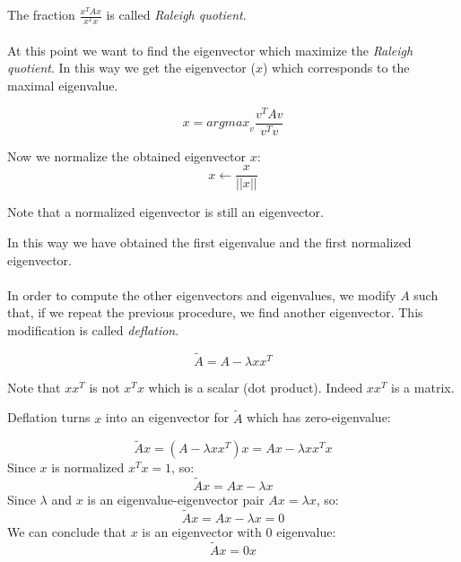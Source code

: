 The fraction $\frac{x^{T}A x}{x^{T}x}$ is called \textit{Raleigh quotient}.

\paragraph{}

At this point we want to find the eigenvector which maximize the \textit{Raleigh
quotient}. In this way we get the eigenvector ($x$) which corresponds to the maximal
eigenvalue.

\begin{equation*}
	x = \mathit{argmax}_{v}\frac{v^{T}A v}{v^{T}v}
\end{equation*}

Now we normalize the obtained eigenvector $x$:
\begin{equation*}
	x \leftarrow \frac{x}{||x||}
\end{equation*}

Note that a normalized eigenvector is still an eigenvector.

In this way we have obtained the first eigenvalue and the first normalized
eigenvector.

\paragraph{}

In order to compute the other eigenvectors and eigenvalues, we modify $A$ such that,
if we repeat the previous procedure, we find another eigenvector. This
modification is called \textit{deflation}.

\begin{equation*}
	\tilde{A}= A - \lambda x x^{T}
\end{equation*}

Note that $x x^{T}$ is not $x^{T}x$ which is a scalar (dot product). Indeed $x x^{T}$
is a matrix.

Deflation turns $x$ into an eigenvector for $\tilde{A}$ which has zero-eigenvalue:

\begin{equation*}
	\tilde{A}x = (A - \lambda x x^{T}) x = Ax - \lambda x x^{T}x
\end{equation*}
Since $x$ is normalized $x^{T}x = 1$, so:
\begin{equation*}
	\tilde{A}x = Ax - \lambda x
\end{equation*}
Since $\lambda$ and $x$ is an eigenvalue-eigenvector pair $Ax = \lambda x$, so:
\begin{equation*}
	\tilde{A}x = Ax - \lambda x = 0
\end{equation*}
We can conclude that $x$ is an eigenvector with 0 eigenvalue:
\begin{equation*}
	\tilde{A}x = 0x
\end{equation*}

